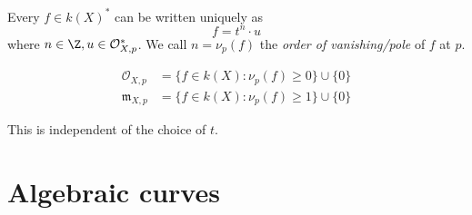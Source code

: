 \documentclass[a4paper]{article}
\begin{document}
\begin{corollary}
  Every \(f \in k(X)^*\) can be written uniquely as
  \[
    f = t^n \cdot u
  \]
  where \(n \in \Z, u \in \mathcal O_{X, p}^*\). We call \(n = \nu_p(f)\) the \emph{order of vanishing/pole} of \(f\) at \(p\).

  \begin{align*}
    \mathcal O_{X, p} &= \{f \in k(X): \nu_p(f) \geq 0\} \cup \{0\} \\
    \mathfrak m_{X, p} &= \{f \in k(X): \nu_p(f) \geq 1\} \cup \{0\}
  \end{align*}
\end{corollary}
This is independent of the choice of \(t\).


























\iffalse

\section{Algebraic curves}
\end{document}
